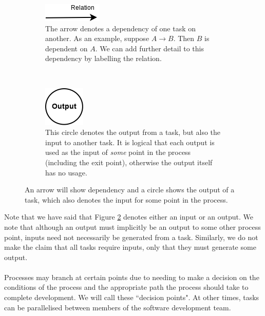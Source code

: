 \begin{figure}[h!]
\centering
\begin{subfigure}[b]{.45\textwidth}
\centering
\includegraphics[scale=0.6]{media/Dependency}
\caption{The arrow denotes a dependency of one task on another. As an example, suppose $A \to B$.
	Then $B$ is dependent on $A$.
We can add further detail to this dependency by labelling the relation.}
\label{depFigure}
\end{subfigure}
~
\begin{subfigure}[b]{.45\textwidth}
\centering
\includegraphics[scale=0.6]{media/Output}
\caption{This circle denotes the output from a task, but also the input to another task. It
is logical that each output is used as the input of {\em some} point in the process (including the
		exit point), otherwise the output itself has no usage.}
\label{outputFigure}
\end{subfigure}
\caption{An arrow will show dependency and a circle shows the output of a task,
which also denotes the input for some point in the process.} \label{depOutFigure}
\end{figure}

\pagebreak %

Note that we have said that Figure \ref{outputFigure} denotes either an input or an
output.
We note that although an output must implicitly be an output to some other
process point, inputs need not necessarily be generated from a task.
Similarly, we do not make the claim that all tasks require inputs, only that
they must generate some output.\\
\\
Processes may branch at certain points due to needing to make a decision on the conditions of the
process and the appropriate path the process should take to complete development.
We will call these ``decision points".
At other times, tasks can be parallelised between members of the software development team.

